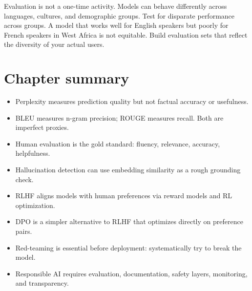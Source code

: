 \begin{ethicsbox}
Evaluation is not a one-time activity. Models can behave differently across languages, cultures, and demographic groups. Test for disparate performance across groups. A model that works well for English speakers but poorly for French speakers in West Africa is not equitable. Build evaluation sets that reflect the diversity of your actual users.
\end{ethicsbox}

\section{Chapter summary}

\begin{itemize}
  \item Perplexity measures prediction quality but not factual accuracy or usefulness.
  \item BLEU measures n-gram precision; ROUGE measures recall. Both are imperfect proxies.
  \item Human evaluation is the gold standard: fluency, relevance, accuracy, helpfulness.
  \item Hallucination detection can use embedding similarity as a rough grounding check.
  \item RLHF aligns models with human preferences via reward models and RL optimization.
  \item DPO is a simpler alternative to RLHF that optimizes directly on preference pairs.
  \item Red-teaming is essential before deployment: systematically try to break the model.
  \item Responsible AI requires evaluation, documentation, safety layers, monitoring, and transparency.
\end{itemize}
